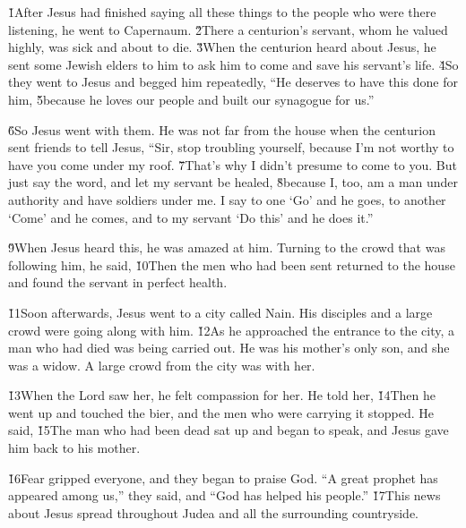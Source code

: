 \v{1}After Jesus had finished saying all these things to the people who were there listening, he went to Capernaum. \v{2}There a centurion's servant, whom he valued highly, was sick and about to die. \v{3}When the centurion heard about Jesus, he sent some Jewish elders to him to ask him to come and save his servant's life. \v{4}So they went to Jesus and begged him repeatedly, ``He deserves to have this done for him, \v{5}because he loves our people and built our synagogue for us.''

\v{6}So Jesus went with them. He was not far from the house when the centurion sent friends to tell Jesus, ``Sir, stop troubling yourself, because I'm not worthy to have you come under my roof. \v{7}That's why I didn't presume to come to you. But just say the word, and let my servant be healed, \v{8}because I, too, am a man under authority and have soldiers under me. I say to one `Go' and he goes, to another `Come' and he comes, and to my servant `Do this' and he does it.''

\v{9}When Jesus heard this, he was amazed at him. Turning to the crowd that was following him, he said,  \v{10}Then the men who had been sent returned to the house and found the servant in perfect health.

\v{11}Soon afterwards, Jesus went to a city called Nain. His disciples and a large crowd were going along with him. \v{12}As he approached the entrance to the city, a man who had died was being carried out. He was his mother's only son, and she was a widow. A large crowd from the city was with her.

\v{13}When the Lord saw her, he felt compassion for her. He told her,  \v{14}Then he went up and touched the bier, and the men who were carrying it stopped. He said,  \v{15}The man who had been dead sat up and began to speak, and Jesus gave him back to his mother.

\v{16}Fear gripped everyone, and they began to praise God. ``A great prophet has appeared among us,'' they said, and ``God has helped his people.'' \v{17}This news about Jesus spread throughout Judea and all the surrounding countryside.

